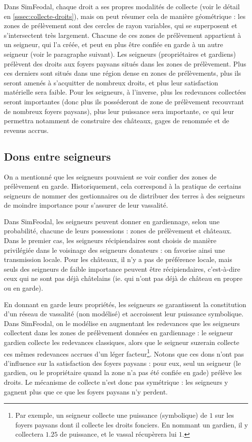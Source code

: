 Dans SimFeodal, chaque droit a ses propres modalités de collecte (voir le détail en \cref{sssec:collecte-droits}), mais on peut résumer cela de manière géométrique : les zones de prélèvement sont des cercles de rayon variables, qui se superposent et s'intersectent très largement.
Chacune de ces zones de prélèvement appartient à un seigneur, qui l'a créée, et peut en plus être confiée en garde à un autre seigneur (voir le paragraphe suivant).
Les seigneurs (propriétaires et gardiens) prélèvent des droits aux foyers paysans situés dans les zones de prélèvement.
Plus ces derniers sont situés dans une région dense en zones de prélèvements, plus ils seront amenés à s'acquitter de nombreux droits, et plus leur satisfaction matérielle sera faible.
Pour les seigneurs, à l'inverse, plus les redevances collectées seront importantes (donc plus ils posséderont de zone de prélèvement recouvrant de nombreux foyers paysans), plus leur puissance sera importante, ce qui leur permettra notamment de construire des châteaux, gages de renommée et de revenus accrus.

\subsection{Dons entre seigneurs \label{meca-dons}}

On a mentionné que les seigneurs pouvaient se voir confier des zones de prélèvement en garde.
Historiquement, cela correspond à la pratique de certains seigneurs de nommer des gestionnaires ou de distribuer des terres à des seigneurs de moindre importance pour s'assurer de leur vassalité.

Dans SimFeodal, les seigneurs peuvent donner en gardiennage, selon une probabilité, chacune de leurs possessions : zones de prélèvement et châteaux.
Dans le premier cas, les seigneurs récipiendaires sont choisis de manière privilégiée dans le voisinage des seigneurs donateurs : on favorise ainsi une transmission locale.
Pour les châteaux, il n'y a pas de préférence locale, mais seuls des seigneurs de faible importance peuvent être récipiendaires, c'est-à-dire ceux qui ne sont pas déjà châtelains (ie. qui n'ont pas déjà de château en propre ou en garde).

En donnant en garde leurs propriétés, les seigneurs se garantissent la constitution d'un réseau de vassalité (non modélisé) et accroissent leur puissance symbolique.
Dans SimFeodal, on le modélise en augmentant les redevances que les seigneurs collectent dans les zones de prélèvement données en gardiennage : le seigneur gardien collecte les redevances classiques, alors que le seigneur suzerain collecte ces mêmes redevances accrues d'un léger facteur\footnote{
Par exemple, un seigneur collecte une puissance (symbolique) de $1$ sur les foyers paysans dont il collecte les droits fonciers.
En nommant un \og gardien\fg{}, il y collectera $1.25$ de puissance, et le vassal récupèrera lui $1$.
}.
Notons que ces dons n'ont pas d'influence sur la satisfaction des foyers paysans : pour eux, seul un seigneur (le gardien, ou le propriétaire quand la zone n'a pas été confiée en gade) prélève les droits.
Le mécanisme de collecte n'est donc pas symétrique : les seigneurs y gagnent plus que ce que les foyers paysans n'y \og perdent\fg{}.


